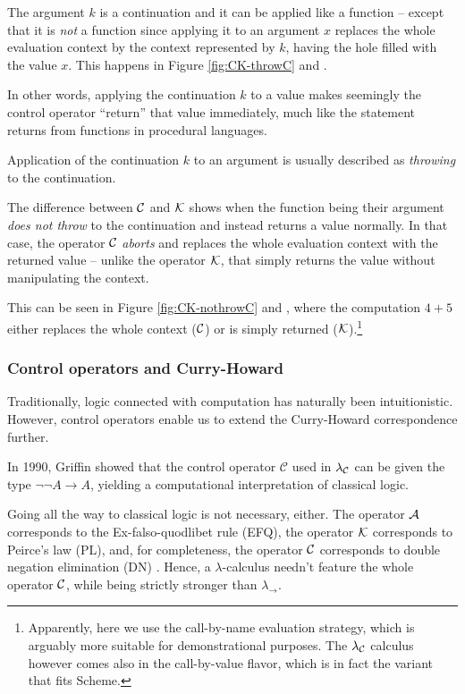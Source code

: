 The argument $k$ is a continuation and it can be applied like a function -- except that it
is \emph{not} a function since applying it to an argument $x$ replaces the whole evaluation
context by the context represented by $k$, having the hole filled with the value $x$.
This happens in Figure \ref{fig:CK-throwC} and .

In other words, applying the continuation $k$ to a value makes seemingly the control operator
``return'' that value immediately, much like the  statement returns from functions
in procedural languages.

Application of the continuation $k$ to an argument is usually described as
\emph{throwing} to the continuation.

The difference between $\mathcal{C}$ and $\mathcal{K}$ shows when the function being their argument
\emph{does not throw} to the continuation and instead returns a value normally. In that case,
the operator $\mathcal{C}$ \emph{aborts} and replaces the whole evaluation context with the returned
value -- unlike the operator $\mathcal{K}$, that simply returns the value without manipulating
the context.

This can be seen in Figure \ref{fig:CK-nothrowC} and , where the
computation $4 + 5$ either replaces the whole context ($\mathcal{C}$) or is simply returned
($\mathcal{K}$).\footnote{Apparently, here we use the call-by-name evaluation strategy, which
is arguably more suitable for demonstrational purposes. The $\lambda_{\mathcal{C}}$ calculus however comes
also in the call-by-value flavor, which is in fact the variant that fits Scheme.}

\subsubsection{Control operators and Curry-Howard}

Traditionally, logic connected with computation has naturally been intuitionistic.
However, control operators enable us to extend the Curry-Howard correspondence
further.

In 1990, Griffin showed \cite{griffin90} that the control operator $\mathcal{C}$
used in $\lambda_{\mathcal{C}}$ can be given the type $\neg \neg A \to A$, yielding a computational
interpretation of classical logic.

Going all the way to classical logic is not necessary, either. The operator $\mathcal{A}$
corresponds to the Ex-falso-quodlibet rule (EFQ), the  operator $\mathcal{K}$
corresponds to Peirce's law (PL), and, for completeness, the operator $\mathcal{C}$
corresponds to double negation elimination (DN) \cite[p.~877]{ariola-herbelin}.
Hence, a $\lambda$-calculus needn't feature the whole operator $\mathcal{C}$,
while being strictly stronger than $\lambda_\to$.

